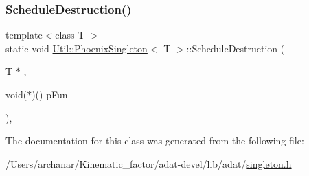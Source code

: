 \subsubsection{\texorpdfstring{ScheduleDestruction()}{ScheduleDestruction()}\hspace{0.1cm}{\footnotesize\ttfamily [3/3]}}
{\footnotesize\ttfamily template$<$class T $>$ \\
static void \mbox{\hyperlink{classUtil_1_1PhoenixSingleton}{Util\+::\+Phoenix\+Singleton}}$<$ T $>$\+::Schedule\+Destruction (\begin{DoxyParamCaption}\item[{T $\ast$}]{,  }\item[{void($\ast$)()}]{p\+Fun }\end{DoxyParamCaption})\hspace{0.3cm}{\ttfamily [inline]}, {\ttfamily [static]}}



The documentation for this class was generated from the following file\+:\begin{DoxyCompactItemize}
\item 
/\+Users/archanar/\+Kinematic\+\_\+factor/adat-\/devel/lib/adat/\mbox{\hyperlink{adat-devel_2lib_2adat_2singleton_8h}{singleton.\+h}}\end{DoxyCompactItemize}
